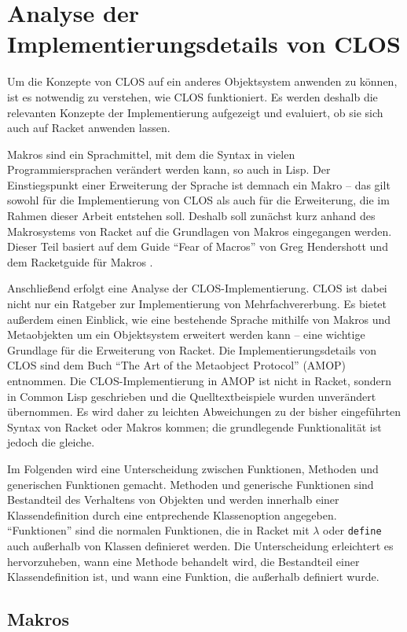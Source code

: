 \chapter{Analyse der Implementierungsdetails von CLOS}
Um die Konzepte von CLOS auf ein anderes Objektsystem anwenden zu können, ist es notwendig zu verstehen, wie CLOS funktioniert. Es werden deshalb die relevanten Konzepte der Implementierung aufgezeigt und evaluiert, ob sie sich auch auf Racket anwenden lassen.

Makros sind ein Sprachmittel, mit dem die Syntax in vielen Programmiersprachen verändert werden kann, so auch in Lisp. Der Einstiegspunkt einer Erweiterung der Sprache ist demnach ein Makro -- das gilt sowohl für die Implementierung von CLOS als auch für die Erweiterung, die im Rahmen dieser Arbeit entstehen soll. Deshalb soll zunächst kurz anhand des Makrosystems von Racket auf die Grundlagen von Makros eingegangen werden. Dieser Teil basiert auf dem Guide ``Fear of Macros'' von Greg Hendershott \cite{fearofmacros} und dem Racketguide für Makros \cite{racketguide-macros}.

Anschließend erfolgt eine Analyse der CLOS-Implementierung. CLOS ist dabei nicht nur ein Ratgeber zur Implementierung von Mehrfachvererbung. Es bietet außerdem einen Einblick, wie eine bestehende Sprache mithilfe von Makros und Metaobjekten um ein Objektsystem erweitert werden kann -- eine wichtige Grundlage für die Erweiterung von Racket. Die Implementierungsdetails von CLOS sind dem Buch ``The Art of the Metaobject Protocol'' (AMOP) \cite{amop} entnommen. Die CLOS-Implementierung in AMOP ist nicht in Racket, sondern in Common Lisp geschrieben und die Quelltextbeispiele wurden unverändert übernommen. Es wird daher zu leichten Abweichungen zu der bisher eingeführten Syntax von Racket oder Makros kommen; die grundlegende Funktionalität ist jedoch die gleiche.

Im Folgenden wird eine Unterscheidung zwischen Funktionen, Methoden und generischen Funktionen gemacht. Methoden und generische Funktionen sind Bestandteil des Verhaltens von Objekten und werden innerhalb einer Klassendefinition durch eine entprechende Klassenoption angegeben. ``Funktionen'' sind die normalen Funktionen, die in Racket mit \texttt{$\lambda$} oder \texttt{define} auch außerhalb von Klassen definieret werden. Die Unterscheidung erleichtert es hervorzuheben, wann eine Methode behandelt wird, die Bestandteil einer Klassendefinition ist, und wann eine Funktion, die außerhalb definiert wurde.

\section{Makros} 
\label{makros}

